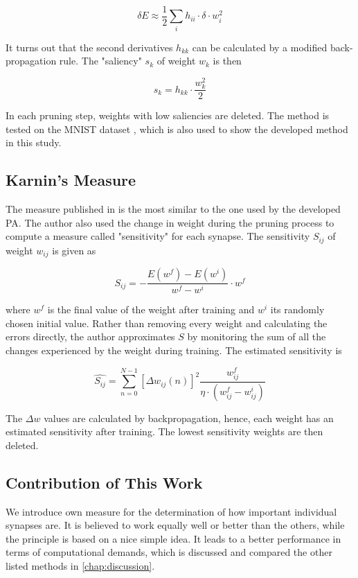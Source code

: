\begin{equation}
\delta E \approx \frac{1}{2} \displaystyle{\sum_i h_{ii} \cdot \delta \cdot w_i^2}
\end{equation}

It turns out that the second derivatives $ h_{kk} $ can be calculated by a modified back-propagation rule. The "saliency" $ s_k $ of weight $ w_k $ is then

\begin{equation}
s_k = h_{kk} \cdot \frac{w_k^2}{2}
\end{equation}

In each pruning step, weights with low saliencies are deleted. The method is tested on the MNIST dataset \citep{lecun:mnist}, which is also used to show the developed method in this study.

\subsection*{Karnin's Measure} \label{ssec:karnins_measure}
The measure published in \citep{karnin:pa} is the most similar to the one used by the developed PA. The author also used the change in weight during the pruning process to compute a measure called "sensitivity" for each synapse. The sensitivity $ S_{ij} $ of weight $ w_{ij} $ is given as

\begin{equation}
S_{ij} = - \frac{E(w^f) - E(w^i)}{w^f - w^i} \cdot w^f
\end{equation}

where $ w^f $ is the final value of the weight after training and $ w^i $ its randomly chosen initial value. Rather than removing every weight and calculating the errors directly, the author approximates $ S $ by monitoring the sum of all the changes experienced by the weight during training. The estimated sensitivity is

\begin{equation}
\hat{S_{ij}} = \displaystyle{\sum_{n=0}^{N-1} \left[\Delta w_{ij} (n)\right]^2 \frac{w_{ij}^f}{\eta \cdot (w_{ij}^f - w_{ij}^i)}}
\end{equation}

The $ \Delta w $ values are calculated by backpropagation, hence, each weight has an estimated sensitivity after training. The lowest sensitivity weights are then deleted.

\subsection*{Contribution of This Work} \label{ssec:contribution_of_this_work}
We introduce own measure for the determination of how important individual synapses are. It is believed to work equally well or better than the others, while the principle is based on a nice simple idea. It leads to a better performance in terms of computational demands, which is discussed and compared the other listed methods in \cref{chap:discussion}.

